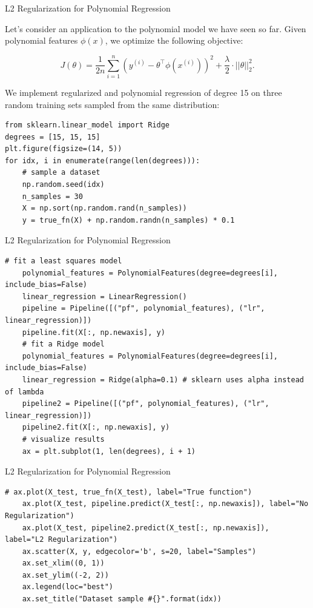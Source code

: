 \documentclass[../../main.tex]{subfiles}
\begin{document}
\begin{frame}[fragile]{L2 Regularization for Polynomial Regression}

Let's consider an application to the polynomial model we have seen so far. Given polynomial features $\phi(x)$, we optimize the following objective:

$$ J(\theta) = \frac{1}{2n} \sum_{i=1}^n \left( y^{(i)} - \theta^\top \phi(x^{(i)}) \right)^2 + \frac{\lambda}{2} \cdot ||\theta||_2^2. $$

We implement regularized and polynomial regression of degree 15 on three random training sets sampled from the same distribution:


\begin{lstlisting}
from sklearn.linear_model import Ridge
degrees = [15, 15, 15]
plt.figure(figsize=(14, 5))
for idx, i in enumerate(range(len(degrees))):
    # sample a dataset
    np.random.seed(idx)
    n_samples = 30
    X = np.sort(np.random.rand(n_samples))
    y = true_fn(X) + np.random.randn(n_samples) * 0.1
\end{lstlisting}
\end{frame}

\begin{frame}[fragile]{L2 Regularization for Polynomial Regression}
\begin{lstlisting}[firstnumber=11]
    # fit a least squares model
    polynomial_features = PolynomialFeatures(degree=degrees[i], include_bias=False)
    linear_regression = LinearRegression()
    pipeline = Pipeline([("pf", polynomial_features), ("lr", linear_regression)])
    pipeline.fit(X[:, np.newaxis], y)
    # fit a Ridge model
    polynomial_features = PolynomialFeatures(degree=degrees[i], include_bias=False)
    linear_regression = Ridge(alpha=0.1) # sklearn uses alpha instead of lambda
    pipeline2 = Pipeline([("pf", polynomial_features), ("lr", linear_regression)])
    pipeline2.fit(X[:, np.newaxis], y) 
    # visualize results
    ax = plt.subplot(1, len(degrees), i + 1)
\end{lstlisting}
\end{frame}

\begin{frame}[fragile]{L2 Regularization for Polynomial Regression}
\begin{lstlisting}[firstnumber=22]
    # ax.plot(X_test, true_fn(X_test), label="True function")    
    ax.plot(X_test, pipeline.predict(X_test[:, np.newaxis]), label="No Regularization")
    ax.plot(X_test, pipeline2.predict(X_test[:, np.newaxis]), label="L2 Regularization")    
    ax.scatter(X, y, edgecolor='b', s=20, label="Samples")
    ax.set_xlim((0, 1))
    ax.set_ylim((-2, 2))
    ax.legend(loc="best")
    ax.set_title("Dataset sample #{}".format(idx))
\end{lstlisting}
\end{frame}
\end{document}
